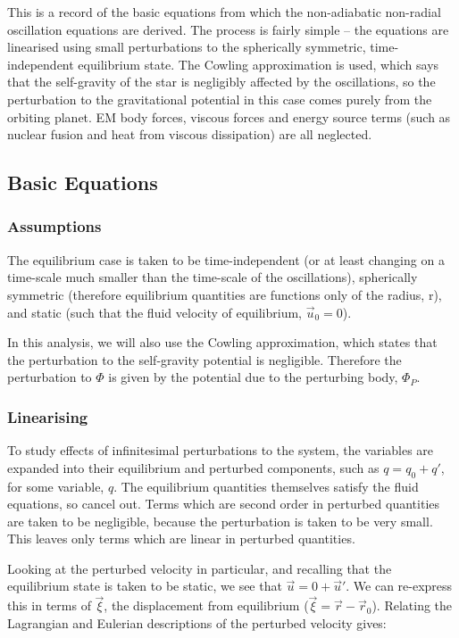 \documentclass[11pt]{amsart}
\begin{document}
This is a record of the basic equations from which the non-adiabatic non-radial oscillation
equations are derived. The process is fairly simple -- the equations are linearised using small
perturbations to the spherically symmetric, time-independent equilibrium state. The Cowling
approximation is used, which says that the self-gravity of the star is negligibly affected by the
oscillations, so the perturbation to the gravitational potential in this case comes purely from the
orbiting planet. EM body forces, viscous forces and energy source terms (such as nuclear fusion and
heat from viscous dissipation) are all neglected.


\subsection{Basic Equations}


\subsubsection{Assumptions}

The equilibrium case is taken to be time-independent (or at least changing on a time-scale much 
smaller than the time-scale of the oscillations), spherically symmetric (therefore equilibrium 
quantities are functions only of the radius, r), and static (such that the fluid velocity of 
equilibrium, $\vec{u}_{0} = 0$).

In this analysis, we will also use the Cowling approximation, which states that the perturbation
to the self-gravity potential is negligible.  Therefore the perturbation to $\Phi$ is given by 
the potential due to the perturbing body, $\Phi_{P}$.



\subsubsection{Linearising}

To study effects of infinitesimal perturbations to the system, the variables are expanded into
their equilibrium and perturbed components, such as $q = q_{0} + q'$, for some variable, $q$.
The equilibrium quantities themselves satisfy the fluid equations, so cancel out.  Terms which are
second order in perturbed quantities are taken to be negligible, because the perturbation is
taken to be very small. This leaves only terms which are linear in perturbed quantities.

Looking at the perturbed velocity in particular, and recalling that the equilibrium state is taken
to be static, we see that $\vec{u} = 0 + \vec{u}'$.  We can re-express this in terms of $\vec{\xi}$,
 the displacement from equilibrium ($\vec{\xi} = \vec{r} - \vec{r}_{0}$).  Relating the Lagrangian and 
Eulerian descriptions of the perturbed velocity gives:
\end{document}
